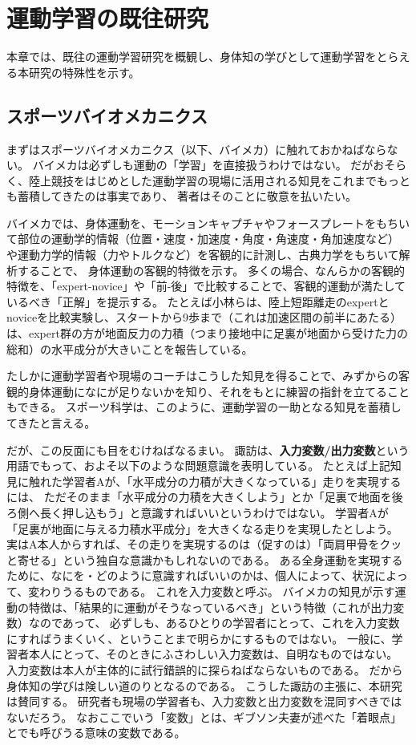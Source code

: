 \chapter{運動学習の既往研究}
\label{chapter:motorlearning}
本章では、既往の運動学習研究を概観し、身体知の学びとして運動学習をとらえる本研究の特殊性を示す。

\section{スポーツバイオメカニクス}
まずはスポーツバイオメカニクス（以下、バイメカ）に触れておかねばならない。
バイメカは必ずしも運動の「学習」を直接扱うわけではない。
だがおそらく、陸上競技をはじめとした運動学習の現場に活用される知見をこれまでもっとも蓄積してきたのは事実であり、
著者はそのことに敬意を払いたい。

バイメカでは、身体運動を、モーションキャプチャやフォースプレートをもちいて部位の運動学的情報（位置・速度・加速度・角度・角速度・角加速度など）
や運動力学的情報（力やトルクなど）を客観的に計測し、古典力学をもちいて解析することで、
身体運動の客観的特徴を示す。
多くの場合、なんらかの客観的特徴を、「expert-novice」や「前-後」で比較することで、客観的運動が満たしているべき「正解」を提示する。
たとえば小林ら\cite{kobayashi:2009}は、陸上短距離走のexpertとnoviceを比較実験し、スタートから9歩まで（これは加速区間の前半にあたる）は、expert群の方が地面反力の力積（つまり接地中に足裏が地面から受けた力の総和）の水平成分が大きいことを報告している。

たしかに運動学習者や現場のコーチはこうした知見を得ることで、みずからの客観的身体運動になにが足りないかを知り、それをもとに練習の指針を立てることもできる。
スポーツ科学は、このように、運動学習の一助となる知見を蓄積してきたと言える。

だが、この反面にも目をむけねばなるまい。
諏訪\cite{suwa:2016}は、\textbf{入力変数/出力変数}という用語でもって、およそ以下のような問題意識を表明している。
たとえば上記知見に触れた学習者Aが、「水平成分の力積が大きくなっている」走りを実現するには、
ただそのまま「水平成分の力積を大きくしよう」とか「足裏で地面を後ろ側へ長く押し込もう」と意識すればいいというわけではない。
学習者Aが「足裏が地面に与える力積水平成分」を大きくなる走りを実現したとしよう。
実はA本人からすれば、その走りを実現するのは（促すのは）「両肩甲骨をクッと寄せる」という独自な意識かもしれないのである。
ある全身運動を実現するために、なにを・どのように意識すればいいのかは、個人によって、状況によって、変わりうるものである。
これを入力変数と呼ぶ。
バイメカの知見が示す運動の特徴は、「結果的に運動がそうなっているべき」という特徴（これが出力変数）なのであって、
必ずしも、あるひとりの学習者にとって、これを入力変数にすればうまくいく、ということまで明らかにするものではない。
一般に、学習者本人にとって、そのときにふさわしい入力変数は、自明なものではない。
入力変数は本人が主体的に試行錯誤的に探らねばならないものである。
だから身体知の学びは険しい道のりとなるのである。
こうした諏訪の主張に、本研究は賛同する。
研究者も現場の学習者も、入力変数と出力変数を混同すべきではないだろう。
なおここでいう「変数」とは、ギブソン夫妻\cite{gibson_gibson_1955}が述べた「着眼点」とでも呼びうる意味の変数である。

